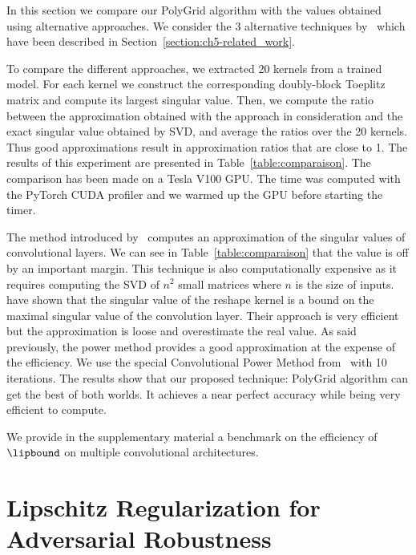 In this section we compare our PolyGrid algorithm with the values obtained using alternative approaches.
We consider the 3 alternative techniques by~\citet{sedghi2018singular,singla2019bounding,farnia2018generalizable} which have been described in Section~\ref{section:ch5-related_work}. 

To compare the different approaches, we extracted 20 kernels from a trained model.
For each kernel we construct the corresponding doubly-block Toeplitz matrix and compute its largest singular value.
Then, we compute the ratio between the approximation obtained with the approach in consideration and the exact singular value obtained by SVD, and average the ratios over the 20 kernels.
Thus good approximations result in approximation ratios that are close to 1.
The results of this experiment are presented in Table~\ref{table:comparaison}.
The comparison has been made on a Tesla V100 GPU. 
The time was computed with the PyTorch CUDA profiler and we warmed up the GPU before starting the timer.

The method introduced by~\citet{sedghi2018singular} computes an approximation of the singular values of convolutional layers.
We can see in Table~\ref{table:comparaison} that the value is off by an important margin.
This technique is also computationally expensive as it requires computing the SVD of $n^2$ small matrices where $n$ is the size of inputs.
\citet{singla2019bounding} have shown that the singular value of the reshape kernel is a bound on the maximal singular value of the convolution layer.
Their approach is very efficient but the approximation is loose and overestimate the real value.
As said previously, the power method provides a good approximation at the expense of the efficiency.
We use the special Convolutional Power Method from~\citet{farnia2018generalizable} with 10 iterations.
The results show that our proposed technique: PolyGrid algorithm can get the best of both worlds.
It achieves a near perfect accuracy while being very efficient to compute. 

We provide in the supplementary material a benchmark on the efficiency of $\lipbound$ on multiple convolutional architectures. 


\section{Lipschitz Regularization for Adversarial Robustness}
\label{section:ch5-lipschitz_regularization_for_adversarial_robustness}

